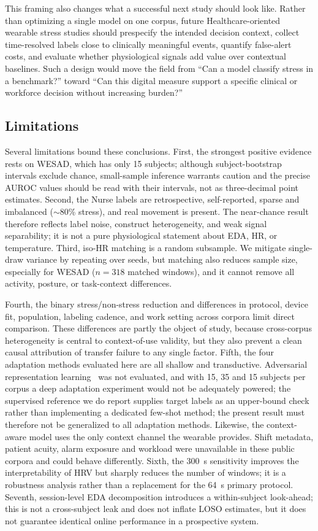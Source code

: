 \documentclass[healthcare,article,submit,moreauthors,pdftex]{Definitions/mdpi}
\begin{document}
This framing also changes what a successful next study should look like. Rather
than optimizing a single model on one corpus, future Healthcare-oriented wearable
stress studies should prespecify the intended decision context, collect
time-resolved labels close to clinically meaningful events, quantify false-alert
costs, and evaluate whether physiological signals add value over contextual
baselines. Such a design would move the field from ``Can a model classify stress
in a benchmark?'' toward ``Can this digital measure support a specific clinical
or workforce decision without increasing burden?''

\subsection{Limitations}

Several limitations bound these conclusions. First, the strongest positive
evidence rests on WESAD, which has only 15 subjects; although subject-bootstrap
intervals exclude chance, small-sample inference warrants caution and the precise
AUROC values should be read with their intervals, not as three-decimal point
estimates. Second, the Nurse labels are retrospective, self-reported, sparse and
imbalanced ($\sim$80\% stress), and real movement is present. The near-chance
result therefore reflects label noise, construct heterogeneity, and weak signal
separability; it is not a pure physiological statement about EDA, HR, or
temperature. Third, iso-HR matching is a random subsample. We mitigate
single-draw variance by repeating over seeds, but matching also reduces sample
size, especially for WESAD ($n=318$ matched windows), and it cannot remove all
activity, posture, or task-context differences.

Fourth, the binary stress/non-stress reduction and differences in protocol,
device fit, population, labeling cadence, and work setting across corpora limit
direct comparison. These differences are partly the object of study, because
cross-corpus heterogeneity is central to context-of-use validity, but they also
prevent a clean causal attribution of transfer failure to any single factor.
Fifth, the four adaptation methods evaluated here are all shallow and
transductive. Adversarial representation
learning~\cite{ganin2016dann,wang2018dasurvey} was not evaluated, and with 15, 35
and 15 subjects per corpus a deep adaptation experiment would not be adequately
powered; the supervised reference we do report supplies target labels as an
upper-bound check rather than implementing a dedicated few-shot method; the present
result must therefore not be generalized to all adaptation methods. Likewise, the
context-aware model uses the only context channel the wearable provides. Shift
metadata, patient acuity, alarm exposure and workload were unavailable in these
public corpora and could behave differently. Sixth,
the 300~s sensitivity improves the interpretability of HRV but sharply reduces
the number of windows; it is a robustness analysis rather than a replacement for
the 64~s primary protocol. Seventh, session-level EDA
decomposition introduces a within-subject look-ahead; this is not a
cross-subject leak and does not inflate LOSO estimates, but it does not guarantee
identical online performance in a prospective system.
\end{document}
